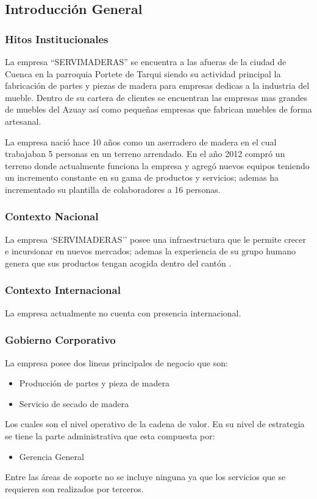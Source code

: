 \documentclass[12pt, a4paper]{article}
\begin{document}
\subsection{Introducción General}
\subsubsection{Hitos Institucionales}

La empresa ``SERVIMADERAS'' se encuentra a las afueras de la ciudad de Cuenca en la parroquia Portete de Tarqui siendo su actividad principal la fabricación de partes y piezas de madera para empresas dedicas a la industria del mueble. Dentro de su cartera de clientes se  encuentran las empresas mas grandes de muebles del Azuay así como pequeñas empresas que fabrican muebles de forma artesanal.

La empresa nació hace 10 años como un aserradero  de madera  en el cual trabajaban 5 personas en un terreno arrendado.   En el año 2012 compró un terreno donde actualmente funciona la empresa y agregó nuevos equipos teniendo un incremento  constante en su gama de productos y servicios; ademas  ha incrementado su plantilla de colaboradores a 16 personas.

\subsubsection{Contexto Nacional}
La empresa `SERVIMADERAS'' posee una infraestructura  que le permite crecer e incursionar en nuevos mercados; ademas la experiencia de su grupo humano genera que sus productos tengan acogida dentro del cantón . 


\subsubsection{Contexto Internacional}
La empresa actualmente no cuenta con presencia internacional.

\subsubsection{Gobierno Corporativo}
La empresa posee dos lineas principales de negocio que son:
\begin{itemize}
	\item Producción de partes y pieza de madera
	\item Servicio de secado de madera
\end{itemize}

Los cuales son el nivel operativo de la cadena de valor. En su nivel de estrategia se tiene la parte administrativa que esta compuesta por:
\begin{itemize}
\item Gerencia General
\end{itemize}
Entre las áreas de soporte no se incluye ninguna ya que los servicios que se requieren son realizados por terceros.
\end{document}
